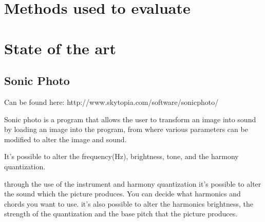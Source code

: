 \section{Methods used to evaluate}\label{sub:methodsusedtoevaluate}






\section{State of the art}\label{sec:stateart}

\subsection{Sonic Photo}\label{sub:sonic}
Can be found here: http://www.skytopia.com/software/sonicphoto/

Sonic photo is a program that allows the user to transform an image into sound by loading an image into the program, from where various parameters can be modified to alter the image and sound. 

It's possible to alter the frequency(Hz), brightness, tone, and the harmony quantization. 

through the use of the instrument and harmony quantization it's possible to alter the sound which the picture produces. 
You can decide what harmonics and chords you want to use. 
it's also possible to alter the harmonics brightness, the strength of the quantization and the base pitch that the picture produces. 